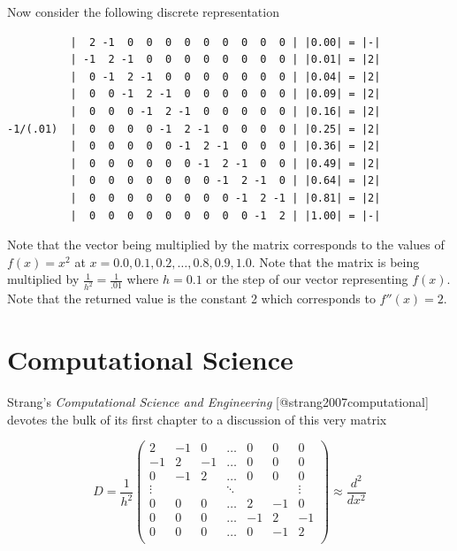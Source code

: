 \documentclass[12pt,]{book}
\newenvironment{Shaded}{}{}
\begin{document}
Now consider the following discrete representation

\begin{verbatim}
          |  2 -1  0  0  0  0  0  0  0  0  0 | |0.00| = |-|
          | -1  2 -1  0  0  0  0  0  0  0  0 | |0.01| = |2| 
          |  0 -1  2 -1  0  0  0  0  0  0  0 | |0.04| = |2|
          |  0  0 -1  2 -1  0  0  0  0  0  0 | |0.09| = |2|
          |  0  0  0 -1  2 -1  0  0  0  0  0 | |0.16| = |2|
-1/(.01)  |  0  0  0  0 -1  2 -1  0  0  0  0 | |0.25| = |2|
          |  0  0  0  0  0 -1  2 -1  0  0  0 | |0.36| = |2|
          |  0  0  0  0  0  0 -1  2 -1  0  0 | |0.49| = |2|
          |  0  0  0  0  0  0  0 -1  2 -1  0 | |0.64| = |2|
          |  0  0  0  0  0  0  0  0 -1  2 -1 | |0.81| = |2|
          |  0  0  0  0  0  0  0  0  0 -1  2 | |1.00| = |-|
\end{verbatim}

Note that the vector being multiplied by the matrix corresponds to the
values of \(f(x)=x^2\) at \(x=0.0,0.1,0.2,\dots,0.8,0.9,1.0\). Note that
the matrix is being multiplied by \(\frac{1}{h^2}=\frac{1}{.01}\) where
\(h=0.1\) or the step of our vector representing \(f(x)\). Note that the
returned value is the constant 2 which corresponds to \(f''(x)=2\).

\begin{Shaded}
\begin{Highlighting}[]

\end{Highlighting}
\end{Shaded}

\section{Computational Science}\label{computational-science}

Strang's \emph{Computational Science and Engineering}
{[}@strang2007computational{]} devotes the bulk of its first chapter to
a discussion of this very matrix

\[D =
\frac{1}{h^2}\left(\begin{matrix}
 2 & -1 &  0 & \dots &  0 &  0 &  0 \\
-1 &  2 & -1 & \dots &  0 &  0 &  0 \\
 0 & -1 &  2 & \dots &  0 &  0 &  0 \\
\vdots & \ & \ & \ddots & \ & \ & \vdots \\
 0 &  0 &  0 & \dots &  2 & -1 &  0 \\
 0 &  0 &  0 & \dots & -1 &  2 & -1 \\
 0 &  0 &  0 & \dots &  0 & -1 &  2 \\
\end{matrix}\right)\approx\frac{d^2}{dx^2}
\]
\end{document}
